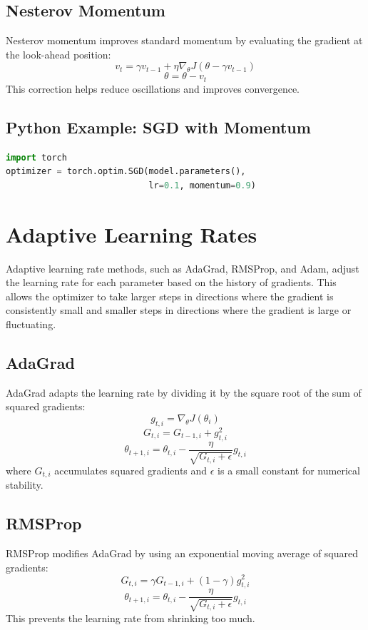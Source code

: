 \begin{notechapter}
\subsection{Nesterov Momentum}
Nesterov momentum improves standard momentum by evaluating 
the gradient at the look-ahead position:
\[
v_t = \gamma v_{t-1} + \eta \nabla_\theta J(\theta - \gamma v_{t-1})
\]
\[
\theta = \theta - v_t
\]
This correction helps reduce oscillations and improves 
convergence.

\subsection{Python Example: SGD with Momentum}
\begin{lstlisting}[language=Python]
import torch
optimizer = torch.optim.SGD(model.parameters(), 
                            lr=0.1, momentum=0.9)
\end{lstlisting}

\section{Adaptive Learning Rates}
Adaptive learning rate methods, such as AdaGrad, RMSProp,
and Adam, adjust the learning rate for each parameter based
on the history of gradients. This allows the optimizer to take
larger steps in directions where the gradient is consistently
small and smaller steps in directions where the gradient is
large or fluctuating.

\subsection{AdaGrad}
AdaGrad adapts the learning rate by dividing it by the 
square root of the sum of squared gradients:
\[
g_{t,i} = \nabla_\theta J(\theta_i)
\]
\[
G_{t,i} = G_{t-1,i} + g_{t,i}^2
\]
\[
\theta_{t+1,i} = \theta_{t,i} - \frac{\eta}{\sqrt{G_{t,i} + \epsilon}} g_{t,i}
\]
where \(G_{t,i}\) accumulates squared gradients and 
\(\epsilon\) is a small constant for numerical stability.

\subsection{RMSProp}
RMSProp modifies AdaGrad by using an exponential moving 
average of squared gradients:
\[
G_{t,i} = \gamma G_{t-1,i} + (1 - \gamma) g_{t,i}^2
\]
\[
\theta_{t+1,i} = \theta_{t,i} - \frac{\eta}{\sqrt{G_{t,i} + \epsilon}} g_{t,i}
\]
This prevents the learning rate from shrinking too much.


\end{notechapter}
